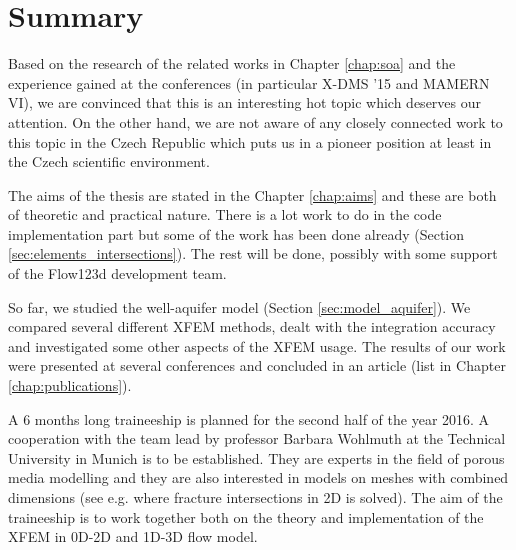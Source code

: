 \documentclass[dvipsnames,FM,Dis]{tulthesis}
\begin{document}

\chapter{Summary} \label{chap:summary}

Based on the research of the related works in Chapter \ref{chap:soa} and the experience gained at the conferences
(in particular X-DMS '15 and MAMERN VI), we are convinced that this is an interesting hot topic which deserves
our attention. On the other hand, we are not aware of any closely connected work to this topic in the Czech Republic
which puts us in a pioneer position at least in the Czech scientific environment.

The aims of the thesis are stated in the Chapter \ref{chap:aims} and these are both of theoretic and practical nature.
There is a lot work to do in the code implementation part but some of the work has been done already 
(Section \ref{sec:elements_intersections}). The rest will be done, possibly with some support of the Flow123d development team. 

So far, we studied the well-aquifer model (Section \ref{sec:model_aquifer}). We compared several different XFEM methods, 
dealt with the integration accuracy and investigated some other aspects of the XFEM usage. The results
of our work were presented at several conferences and concluded in an article (list in Chapter \ref{chap:publications}).

A 6 months long traineeship is planned for the second half of the year 2016. A cooperation with the team lead
by professor Barbara Wohlmuth at the Technical University in Munich is to be established. They are experts
in the field of porous media modelling and they are also interested in models on meshes with combined dimensions
(see e.g. \cite{schwenck_2015} where fracture intersections in 2D is solved). The aim of the traineeship is to
work together both on the theory and implementation of the XFEM in 0D-2D and 1D-3D flow model.



 
%

\end{document}
